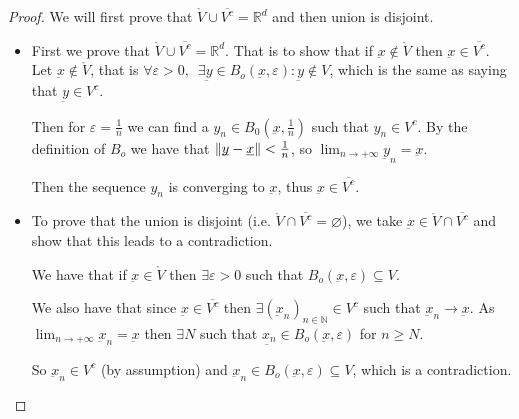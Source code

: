 \documentclass[10pt]{extarticle}
\newcommand{\R}{\mathbb{R}}
\newcommand{\N}{\mathbb{N}}
\newcommand{\munderbar}[1]{\underbar{\ensuremath{#1}}}
\begin{document}
                \begin{proof}
                    We will first prove that $\mathring{V} \cup \overline{V^c} = \R^d$ and then union is disjoint.

                    \begin{itemize}
                        \item
                              First we prove that $\mathring{V} \cup \overline{V^c} = \R^d$. That is to show that if $\munderbar{x} \notin \mathring{V}$ then $\munderbar{x} \in \overline{V^c}$.
                              Let $\munderbar{x} \notin \mathring{V}$, that is
                              $\forall \varepsilon > 0, \enspace \exists \munderbar{y} \in B_o(\munderbar{x}, \varepsilon) : \munderbar{y} \notin V$, which is the same as saying that $\munderbar{y} \in V^c$.

                              Then for $\varepsilon = \frac{1}{n}$ we can find a $y_n \in B_0 \left(\munderbar{x}, \frac{1}{n} \right)$ such that $y_n \in V^c$.
                              By the definition of $B_o$ we have that $\norm{\munderbar{y} - \munderbar{x}} < \frac{1}{n}$, so $\lim_{n \to +\infty} \munderbar{y}_n = \munderbar{x}$.

                              Then the sequence $y_n$ is converging to $\munderbar{x}$, thus $\munderbar{x} \in \overline{V^c}$.

                        \item
                              To prove that the union is disjoint (i.e. $\mathring{V} \cap \overline{V^c} = \varnothing$), we take $\munderbar{x} \in \mathring{V} \cap \overline{V^c}$ and show that this leads to a contradiction.

                              We have that if $\munderbar{x} \in \mathring{V}$ then $\exists \varepsilon > 0$ such that $B_o(\munderbar{x}, \varepsilon) \subseteq V$.

                              We also have that since $\munderbar{x} \in \overline{V^c}$ then $\exists \left(\munderbar{x}_n\right)_{n \in \N} \in V^c$ such that $\munderbar{x}_n \to \munderbar{x}$.
                              As $\lim_{n \to +\infty} \munderbar{x}_n = \munderbar{x}$ then $\exists N$ such that $\munderbar{x_n} \in B_o(\munderbar{x}, \varepsilon)$ for $n \geq N$.

                              So $\munderbar{x}_n \in V^c$ (by assumption) and $\munderbar{x}_n \in B_o(\munderbar{x}, \varepsilon) \subseteq V$, which is a contradiction.
                    \end{itemize}


\end{proof}
\end{document}
